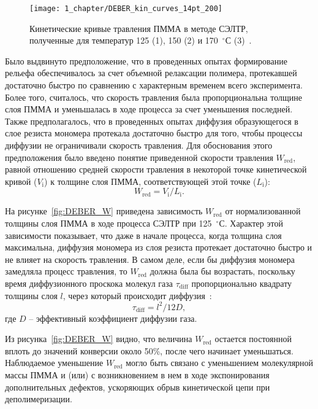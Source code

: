 \begin{figure}[h]
	\centering
	\texttt{[image: 1\_chapter/DEBER\_kin\_curves\_14pt\_200]}
	\vspace{0.5em}
	\caption{Кинетические кривые травления ПММА в методе СЭЛТР, полученные для температур 125 (1), 150 (2) и 170~$^\circ$С (3)~\cite{Bruk_2013}.}
	\label{fig:kin_curves}
\end{figure}

Было выдвинуто предположение, что в проведенных опытах формирование рельефа обеспечивалось за счет объемной релаксации полимера, протекавшей достаточно быстро по сравнению с характерным временем всего эксперимента.
Более того, считалось, что скорость травления была пропорциональна толщине слоя ПММА и уменьшалась в ходе процесса за счет уменьшения последней.
Также предполагалось, что в проведенных опытах диффузия образующегося в слое резиста мономера протекала достаточно быстро для того, чтобы процессы диффузии не ограничивали скорость травления.
Для обоснования этого предположения было введено понятие приведенной скорости травления $W_\mathrm{red}$, равной отношению средней скорости травления в некоторой точке кинетической кривой ($V_\mathrm{i}$) к толщине слоя ПММА, соответствующей этой точке ($L_\mathrm{i}$):
\begin{equation}
	W_\mathrm{red} = V_\mathrm{i} / L_\mathrm{i}.
\end{equation}

На рисунке~\ref{fig:DEBER_W} приведена зависимость $W_\mathrm{red}$ от нормализованной толщины слоя ПММА в ходе процесса СЭЛТР при 125~$^\circ$С. Характер этой зависимости показывает, что даже в начале процесса, когда толщина слоя максимальна, диффузия мономера из слоя резиста протекает достаточно быстро и не влияет на скорость травления. В самом деле, если бы диффузия мономера замедляла процесс травления, то $W_\mathrm{red}$ должна была бы возрастать, поскольку время диффузионного проскока молекул газа $\tau_\mathrm{diff}$ пропорционально квадрату толщины слоя $l$, через который происходит диффузия~\cite{Bruk_2000}:
\begin{equation}
	\tau_\mathrm{diff} = l^2 / 12 D,
\end{equation}
где $D$ -- эффективный коэффициент диффузии газа.

Из рисунка~\ref{fig:DEBER_W} видно, что величина $W_\mathrm{red}$ остается постоянной вплоть до значений конверсии около 50\%, после чего начинает уменьшаться. Наблюдаемое уменьшение $W_\mathrm{red}$ могло быть связано с уменьшением молекулярной массы ПММА и (или) с возникновением в нем в ходе экспонирования дополнительных дефектов, ускоряющих обрыв кинетической цепи при деполимеризации.

